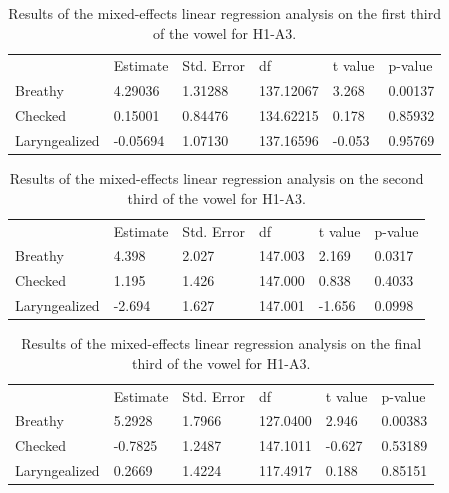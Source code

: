 \documentclass[12pt, letterpaper]{article}
\providecommand{\lsptoprule}{\midrule\toprule}
\providecommand{\lspbottomrule}{\bottomrule\midrule}
\begin{document}
\begin{table}[!h]
	\centering
	\caption{Results of the mixed-effects linear regression analysis on the first third of the vowel for H1-A3. }
	\label{tab:H1A3_First}
	 \begin{tabular}{llllll}
	  \lsptoprule
						&  Estimate  & Std. Error & df & t value & p-value \\
	  	Breathy   		&  4.29036  &  1.31288 & 137.12067 &  3.268  &  0.00137\\
		Checked    		&  0.15001  &  0.84476 & 134.62215 &  0.178  &  0.85932 \\
		Laryngealized	& -0.05694  &  1.07130 & 137.16596 & -0.053  &  0.95769\\
	  \lspbottomrule
	 \end{tabular}
\end{table}

\begin{table}[!h]
	\centering
	\caption{Results of the mixed-effects linear regression analysis on the second third of the vowel for H1-A3. }
	\label{tab:H1A3_Second}
	 \begin{tabular}{llllll}
	  \lsptoprule
						&  Estimate  & Std. Error & df & t value & p-value \\
	  	Breathy   		&  4.398    &  2.027 & 147.003 &  2.169 &  0.0317 \\
		Checked    		&  1.195    &  1.426 & 147.000 &  0.838 &  0.4033  \\
		Laryngealized	& -2.694    &  1.627 & 147.001 & -1.656 &  0.0998 \\
	  \lspbottomrule
	 \end{tabular}
\end{table}

\begin{table}[!h]
	\centering
	\caption{Results of the mixed-effects linear regression analysis on the final third of the vowel for H1-A3. }
	\label{tab:H1A3_Third}
	 \begin{tabular}{llllll}
	  \lsptoprule
						&  Estimate  & Std. Error & df & t value & p-value \\
	  	Breathy   		&  5.2928   &  1.7966 & 127.0400 &  2.946 & 0.00383 \\
		Checked    		& -0.7825   &  1.2487 & 147.1011 & -0.627 & 0.53189 \\
		Laryngealized	& 0.2669    &  1.4224 & 117.4917 &  0.188 & 0.85151 \\
	  \lspbottomrule
	 \end{tabular}
\end{table}
\end{document}
